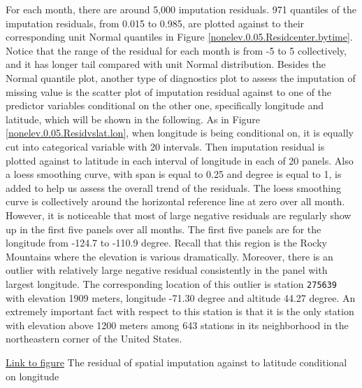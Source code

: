 For each month, there are around 5,000 imputation residuals. 971 quantiles of the
imputation residuals, from 0.015 to 0.985, are plotted against to their corresponding 
unit Normal quantiles in Figure 
\href{../plots/a1950/spaimpute/nonelev/span0.05/a1950.spaResidcenter.bytime.pdf}
{\ref*{nonelev.0.05.Residcenter.bytime}}. Notice that the range of the residual
for each month is from -5 to 5 collectively, and it has longer tail compared with
unit Normal distribution. Besides the Normal quantile plot, another type of 
diagnostics plot to assess the imputation of missing value is the scatter plot of
imputation residual against to one of the predictor variables conditional on the
other one, specifically longitude and latitude, which will be shown in the following. 
As in Figure
\href{../plots/a1950/spaimpute/nonelev/span0.05/a1950.spaResid.vs.lat.lon.pdf}
{\ref*{nonelev.0.05.Residvslat.lon}}, when longitude is being conditional on, it
is equally cut into categorical variable with 20 intervals. Then imputation 
residual is plotted against to latitude in each interval of longitude in each of
20 panels. Also a loess smoothing curve, with span is equal to 0.25 and degree is
equal to 1, is added to help us assess the overall trend of the residuals. The 
loess smoothing curve is collectively around the horizontal reference line at zero
over all month. However, it is noticeable that most of large negative residuals are
regularly show up in the first five panels over all months. The first five panels
are for the longitude from -124.7 to -110.9 degree. Recall that this region is
the Rocky Mountains where the elevation is various dramatically.
Moreover, there is an outlier with relatively large negative residual consistently 
in the panel with largest longitude. The corresponding location of this outlier
is station \texttt{275639} with elevation 1909 meters, longitude -71.30 degree
and altitude 44.27 degree. An extremely important fact with respect to this
station is that it is the only station with elevation above 1200 meters among
643 stations in its neighborhood in the northeastern corner of the United States. 

\begin{framed}
\begin{center}
  \href{../plots/a1950/spaimpute/nonelev/span0.05/a1950.spaResid.vs.lat.lon.pdf}
  {Link to figure}
  {The residual of spatial imputation against to latitude conditional on longitude}
  \label{nonelev.0.05.Residvslat.lon}
\end{center}
\end{framed}

